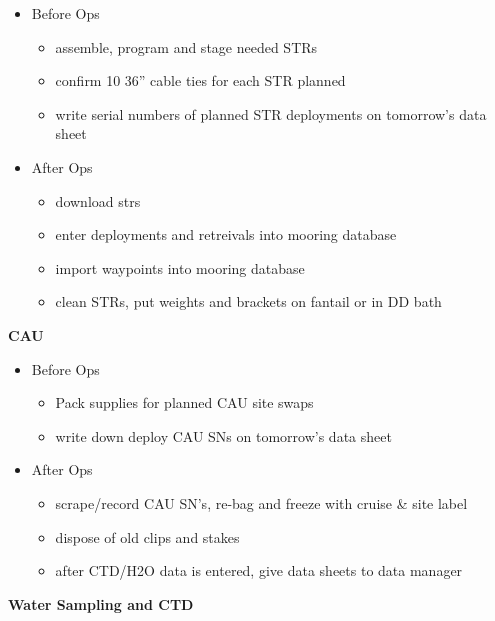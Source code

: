 \documentclass[]{book}
\providecommand{\tightlist}{%
  \setlength{\itemsep}{0pt}\setlength{\parskip}{0pt}}
\begin{document}
\begin{itemize}
\tightlist
\item
  Before Ops

  \begin{itemize}
  \tightlist
  \item
    assemble, program and stage needed STRs
  \item
    confirm 10 36'' cable ties for each STR planned
  \item
    write serial numbers of planned STR deployments on tomorrow's data sheet
  \end{itemize}
\item
  After Ops

  \begin{itemize}
  \tightlist
  \item
    download strs
  \item
    enter deployments and retreivals into mooring database
  \item
    import waypoints into mooring database
  \item
    clean STRs, put weights and brackets on fantail or in DD bath
  \end{itemize}
\end{itemize}

\textbf{CAU}

\begin{itemize}
\tightlist
\item
  Before Ops

  \begin{itemize}
  \tightlist
  \item
    Pack supplies for planned CAU site swaps
  \item
    write down deploy CAU SNs on tomorrow's data sheet
  \end{itemize}
\item
  After Ops

  \begin{itemize}
  \tightlist
  \item
    scrape/record CAU SN's, re-bag and freeze with cruise \& site label
  \item
    dispose of old clips and stakes
  \item
    after CTD/H2O data is entered, give data sheets to data manager
  \end{itemize}
\end{itemize}

\textbf{Water Sampling and CTD}
\end{document}
